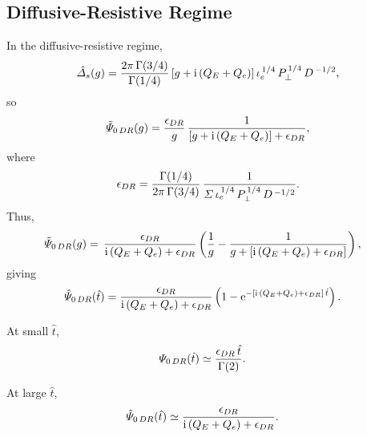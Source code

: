 \documentclass[titlepage=false,12pt]{article}
\begin{document}
\subsection{Diffusive-Resistive Regime}
In the diffusive-resistive regime, 
\begin{equation}
\hat{\mit\Delta}_s(g) = \frac{2\pi\,\Gamma(3/4)}{\Gamma(1/4)}\,[g+ {\rm i}\,(Q_E+Q_e)]\,\iota_e^{\,1/4}\,P_\perp^{\,1/4}\,D^{\,-1/2},
\end{equation}
so
\begin{equation}
\tilde{\mit\Psi}_{0\,DR}(g) =\frac{\epsilon_{DR}}{g}\,\frac{1}
{[g+ {\rm i}\,(Q_E+Q_e)]+\epsilon_{DR}},
\end{equation}
where
\begin{equation}
\epsilon_{DR} = \frac{\Gamma(1/4)}{2\pi\,\Gamma(3/4)}\,\frac{1}{{\mit\Sigma}\,\iota_e^{\,1/4}\,P_\perp^{\,1/4}\,D^{\,-1/2}}.
\end{equation}
Thus,
\begin{align}
\tilde{\mit\Psi}_{0\,DR}(g) &=
\,\frac{\epsilon_{DR}}{{\rm i}\,(Q_E+Q_e)+\epsilon_{DR}}\left(\frac{1}{g} - \frac{1}{g + [{\rm i}\,(Q_E+Q_e)+\epsilon_{DR}]}\right),
\end{align}
giving
\begin{align}
\hat{\mit\Psi}_{0\,DR}(\hat{t}) &=
\frac{\epsilon_{DR}}{{\rm i}\,(Q_E+Q_e)+\epsilon_{DR}}\left(1 - {\rm e}^{- [{\rm i}\,(Q_E+Q_e)+\epsilon_{DR}]\,\hat{t}}\right).
\end{align}

At small $\hat{t}$,
\begin{align}
{\mit\Psi}_{0\,DR}(\hat{t}) &\simeq\frac{\epsilon_{DR}\,\hat{t}}{\Gamma(2)}.
\end{align}

At large $\hat{t}$, 
\begin{align}
\hat{\mit\Psi}_{0\,DR}(\hat{t}) &\simeq 
\frac{\epsilon_{DR}}{{\rm i}\,(Q_E+Q_e)+\epsilon_{DR}}.
\end{align}
\end{document}
